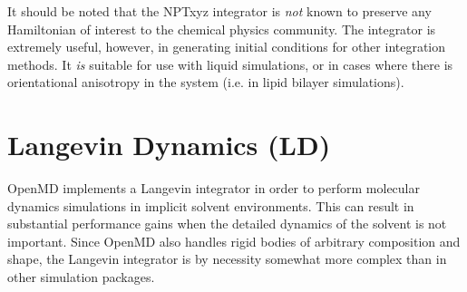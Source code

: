 \documentclass[letterpaper]{report}
\begin{document}
It should be noted that the NPTxyz integrator is {\it not} known to
preserve any Hamiltonian of interest to the chemical physics
community.  The integrator is extremely useful, however, in generating
initial conditions for other integration methods.  It {\it is} suitable
for use with liquid simulations, or in cases where there is
orientational anisotropy in the system (i.e. in lipid bilayer
simulations).

\section{Langevin Dynamics (LD)\label{LDRB}}

OpenMD implements a Langevin integrator in order to perform
molecular dynamics simulations in implicit solvent environments.  This
can result in substantial performance gains when the detailed dynamics
of the solvent is not important. Since OpenMD also handles rigid
bodies of arbitrary composition and shape, the Langevin integrator is
by necessity somewhat more complex than in other simulation packages.
\end{document}
